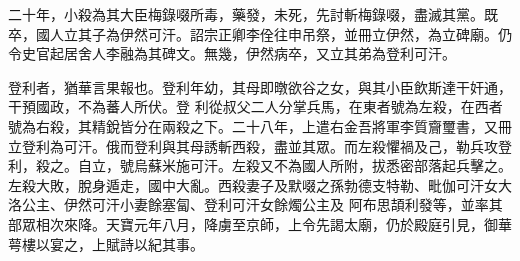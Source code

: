 \begin{pinyinscope}
 二十年，小殺為其大臣梅錄啜所毒，藥發，未死，先討斬梅錄啜，盡滅其黨。既卒，國人立其子為伊然可汗。詔宗正卿李佺往申吊祭，並冊立伊然，為立碑廟。仍令史官起居舍人李融為其碑文。無幾，伊然病卒，又立其弟為登利可汗。



 登利者，猶華言果報也。登利年幼，其母即暾欲谷之女，與其小臣飲斯達干奸通，干預國政，不為蕃人所伏。登
 利從叔父二人分掌兵馬，在東者號為左殺，在西者號為右殺，其精銳皆分在兩殺之下。二十八年，上遣右金吾將軍李質齎璽書，又冊立登利為可汗。俄而登利與其母誘斬西殺，盡並其眾。而左殺懼禍及己，勒兵攻登利，殺之。自立，號烏蘇米施可汗。左殺又不為國人所附，拔悉密部落起兵擊之。左殺大敗，脫身遁走，國中大亂。西殺妻子及默啜之孫勃德支特勒、毗伽可汗女大洛公主、伊然可汗小妻餘塞匐、登利可汗女餘燭公主及
 阿布思頡利發等，並率其部眾相次來降。天寶元年八月，降虜至京師，上令先謁太廟，仍於殿庭引見，御華萼樓以宴之，上賦詩以紀其事。



\end{pinyinscope}
